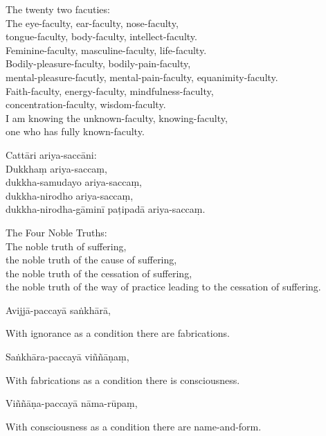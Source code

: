 \begin{english}
  The twenty two facuties:\\
  The eye-faculty, ear-faculty, nose-faculty,\\
  tongue-faculty, body-faculty, intellect-faculty.\\
  Feminine-faculty, masculine-faculty, life-faculty.\\
  Bodily-pleasure-faculty, bodily-pain-faculty,\\
  mental-pleasure-facutly, mental-pain-faculty, equanimity-faculty.\\
  Faith-faculty, energy-faculty, mindfulness-faculty,\\
  concentration-faculty, wisdom-faculty.\\
  I am knowing the unknown-faculty, knowing-faculty,\\
  one who has fully known-faculty.
\end{english}

Cattāri ariya-saccāni:\\
Dukkhaṃ ariya-saccaṃ,\\
dukkha-samudayo ariya-saccaṃ,\\
dukkha-nirodho ariya-saccaṃ,\\
dukkha-nirodha-gāminī paṭipadā ariya-saccaṃ.

\begin{english}
  The Four Noble Truths:\\
  The noble truth of suffering,\\
  the noble truth of the cause of suffering,\\
  the noble truth of the cessation of suffering,\\
  the noble truth of the way of practice leading to the cessation of suffering.
\end{english}

Avijjā-paccayā saṅkhārā,

\begin{english}
  With ignorance as a condition there are fabrications.
\end{english}

Saṅkhāra-paccayā viññāṇaṃ,

\begin{english}
  With fabrications as a condition there is consciousness.
\end{english}

Viññāṇa-paccayā nāma-rūpaṃ,

\begin{english}
  With consciousness as a condition there are name-and-form.
\end{english}

